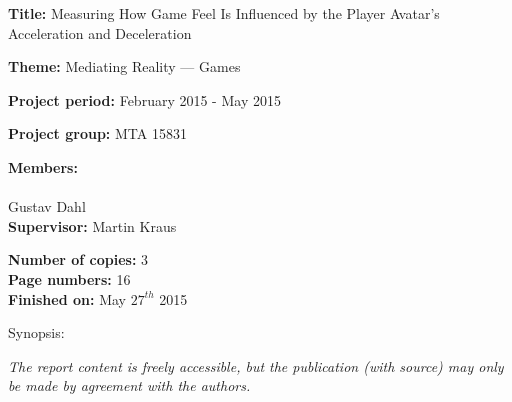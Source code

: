 \begin{minipage}[t]{0.48\textwidth}
\textbf{Title:}  %
\newline
Measuring How Game Feel Is Influenced by the Player Avatar's Acceleration and Deceleration \newline

\textbf{Theme:} %
\newline
Mediating Reality --- Games \newline

\textbf{Project period:} %
\newline
February 2015 - May 2015\newline

\textbf{Project group:} %
\newline
MTA 15831
\newline

\textbf{Members:} \\
\underline{\hspace*{5cm}} \\
Gustav Dahl \\

\textbf{Supervisor:} %
\newline
Martin Kraus
\vspace*{1cm}

\textbf{Number of copies:} 3 \\
\textbf{Page numbers:} 16 \\
\textbf{Finished on:} May $27^{th}$ 2015

\end{minipage}
\hfill
\begin{minipage}[t]{0.483\textwidth}
Synopsis: \\[5pt]
\fbox{\parbox{7cm}{\bigskip\bigskip}}
\end{minipage}

\vfill

{\footnotesize\itshape The report content is freely accessible, but the publication (with source) may only be made by agreement with the authors.}

